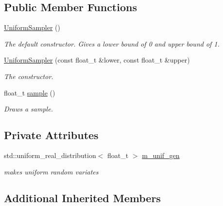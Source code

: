 \subsection*{Public Member Functions}
\begin{DoxyCompactItemize}
\item 
\mbox{\label{classrvsamp_1_1UniformSampler_a0e1d5480bdc2a16d8d4ff39710c06e22}} 
\hyperlink{classrvsamp_1_1UniformSampler_a0e1d5480bdc2a16d8d4ff39710c06e22}{Uniform\+Sampler} ()
\begin{DoxyCompactList}\small\item\em The default constructor. Gives a lower bound of 0 and upper bound of 1. \end{DoxyCompactList}\item 
\hyperlink{classrvsamp_1_1UniformSampler_a3cea78f63c9f4fc86232043af8ffb442}{Uniform\+Sampler} (const float\+\_\+t \&lower, const float\+\_\+t \&upper)
\begin{DoxyCompactList}\small\item\em The constructor. \end{DoxyCompactList}\item 
float\+\_\+t \hyperlink{classrvsamp_1_1UniformSampler_acc8866283171489eccc5f643269b6eed}{sample} ()
\begin{DoxyCompactList}\small\item\em Draws a sample. \end{DoxyCompactList}\end{DoxyCompactItemize}
\subsection*{Private Attributes}
\begin{DoxyCompactItemize}
\item 
\mbox{\label{classrvsamp_1_1UniformSampler_a015cefddd5e6e88f8a7318daec2211cc}} 
std\+::uniform\+\_\+real\+\_\+distribution$<$ float\+\_\+t $>$ \hyperlink{classrvsamp_1_1UniformSampler_a015cefddd5e6e88f8a7318daec2211cc}{m\+\_\+unif\+\_\+gen}
\begin{DoxyCompactList}\small\item\em makes uniform random variates \end{DoxyCompactList}\end{DoxyCompactItemize}
\subsection*{Additional Inherited Members}


